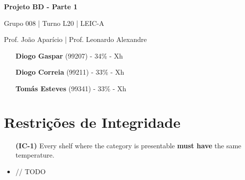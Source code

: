 \documentclass[12pt,a4paper]{article}
\begin{document}
  \begin{titlepage}
    \begin{center}
      \vspace*{5cm}
    
      \Huge
      \textbf{Projeto BD - Parte 1}

      \vspace{0.5cm}
      \LARGE
      Grupo 008 | Turno L20 | LEIC-A

      \vspace{0.5cm}
      \large
      Prof. João Aparício | Prof. Leonardo Alexandre

      \vfill
    \end{center}
    \large
    \begin{itemize}
      \item[] \textbf{Diogo Gaspar} (99207) - 34\% - Xh
      \item[] \textbf{Diogo Correia} (99211) - 33\% - Xh
      \item[] \textbf{Tomás Esteves} (99341) - 33\% - Xh
    \end{itemize}
  \end{titlepage}

  \begin{landscape}
    
  \end{landscape}

  \section*{Restrições de Integridade}
  \begin{itemize}
    \item[\textbf{(IC-1)}] Every shelf where the category is presentable
      \textbf{must have} the same temperature.
    \item // TODO
  \end{itemize}
\end{document}
